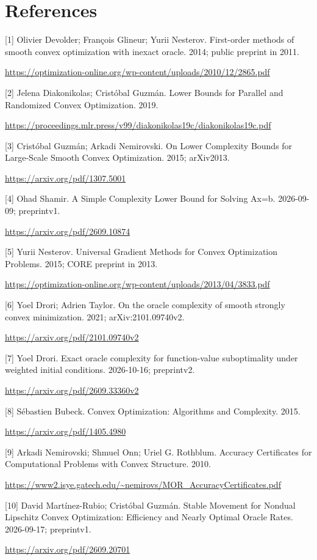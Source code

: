 \documentclass[10pt,a4paper]{article}
\begin{document}
\section{References}
[1] Olivier Devolder; François Glineur; Yurii Nesterov. First-order methods of smooth convex optimization with inexact oracle. 2014; public preprint in 2011.

\url{https://optimization-online.org/wp-content/uploads/2010/12/2865.pdf}

[2] Jelena Diakonikolas; Cristóbal Guzmán. Lower Bounds for Parallel and Randomized Convex Optimization. 2019.

\url{https://proceedings.mlr.press/v99/diakonikolas19c/diakonikolas19c.pdf}

[3] Cristóbal Guzmán; Arkadi Nemirovski. On Lower Complexity Bounds for Large-Scale Smooth Convex Optimization. 2015; arXiv2013.

\url{https://arxiv.org/pdf/1307.5001}

[4] Ohad Shamir. A Simple Complexity Lower Bound for Solving Ax=b. 2026-09-09; preprintv1.

\url{https://arxiv.org/pdf/2609.10874}

[5] Yurii Nesterov. Universal Gradient Methods for Convex Optimization Problems. 2015; CORE preprint in 2013.

\url{https://optimization-online.org/wp-content/uploads/2013/04/3833.pdf}

[6] Yoel Drori; Adrien Taylor. On the oracle complexity of smooth strongly convex minimization. 2021; arXiv:2101.09740v2.

\url{https://arxiv.org/pdf/2101.09740v2}

[7] Yoel Drori. Exact oracle complexity for function-value suboptimality under weighted initial conditions. 2026-10-16; preprintv2.

\url{https://arxiv.org/pdf/2609.33360v2}

[8] Sébastien Bubeck. Convex Optimization: Algorithms and Complexity. 2015.

\url{https://arxiv.org/pdf/1405.4980}

[9] Arkadi Nemirovski; Shmuel Onn; Uriel G. Rothblum. Accuracy Certificates for Computational Problems with Convex Structure. 2010.

\url{https://www2.isye.gatech.edu/~nemirovs/MOR_AccuracyCertificates.pdf}

[10] David Martínez-Rubio; Cristóbal Guzmán. Stable Movement for Nondual Lipschitz Convex Optimization: Efficiency and Nearly Optimal Oracle Rates. 2026-09-17; preprintv1.

\url{https://arxiv.org/pdf/2609.20701}
\end{document}
